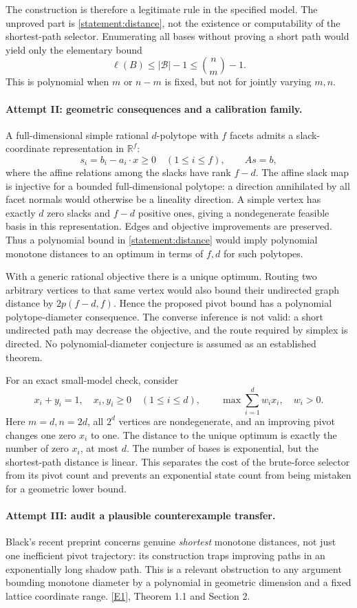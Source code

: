 \documentclass[11pt,a4paper]{article}
\newcommand{\R}{\mathbb{R}}
\newcommand{\eref}[2]{\hyperlink{extra:#1:#2}{[E#2]}}
\numberwithin{equation}{section}
\begin{document}
The construction is therefore a legitimate rule in the specified
model.  The unproved part is \eqref{statement:distance}, not the existence
or computability of the shortest-path selector.  Enumerating all bases
without proving a short path would yield only the elementary bound
\[
 \ell(B)\leq|\mathcal B|-1\leq\binom nm-1.
\]
This is polynomial when $m$ or $n-m$ is fixed, but not for jointly
varying $m,n$.

\paragraph{Attempt II: geometric consequences and a calibration family.}
A full-dimensional simple rational $d$-polytope with $f$ facets admits
a slack-coordinate representation in $\R^f$:
\[
 s_i=b_i-a_i\cdot x\geq0\quad(1\leq i\leq f),\qquad As=b,
\]
where the affine relations among the slacks have rank $f-d$.
The affine slack map is injective for a bounded full-dimensional
polytope: a direction annihilated by all facet normals would otherwise
be a lineality direction.  A simple vertex has exactly $d$ zero slacks
and $f-d$ positive ones, giving a nondegenerate feasible basis in this
representation.  Edges and objective improvements are preserved.
Thus a polynomial bound in \eqref{statement:distance} would imply polynomial
monotone distances to an optimum in terms of $f,d$ for such polytopes.

With a generic rational objective there is a unique optimum.  Routing
two arbitrary vertices to that same vertex would also bound their
undirected graph distance by $2p(f-d,f)$.  Hence the proposed pivot
bound has a polynomial polytope-diameter consequence.  The converse
inference is not valid: a short undirected path may decrease the
objective, and the route required by simplex is directed.  No
polynomial-diameter conjecture is assumed as an established theorem.

For an exact small-model check, consider
\[
 x_i+y_i=1,\quad x_i,y_i\geq0\quad(1\leq i\leq d),\qquad
 \max\sum_{i=1}^d w_i x_i,\quad w_i>0.
\]
Here $m=d,n=2d$, all $2^d$ vertices are nondegenerate, and an improving
pivot changes one zero $x_i$ to one.  The distance to the unique
optimum is exactly the number of zero $x_i$, at most $d$.  The number
of bases is exponential, but the shortest-path distance is linear.
This separates the cost of the brute-force selector from its pivot
count and prevents an exponential state count from being mistaken
for a geometric lower bound.

\paragraph{Attempt III: audit a plausible counterexample transfer.}
Black's recent preprint concerns genuine \emph{shortest} monotone
distances, not just one inefficient pivot trajectory: its construction
traps improving paths in an exponentially long shadow path.  This is
a relevant obstruction to any argument bounding monotone diameter by
a polynomial in geometric dimension and a fixed lattice coordinate
range. \eref{statement}{1}, Theorem 1.1 and Section 2.
\end{document}
